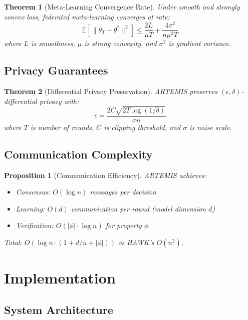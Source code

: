 \documentclass[conference]{IEEEtran}
\newtheorem{theorem}{Theorem}
\newtheorem{proposition}{Proposition}
\begin{document}
\begin{theorem}[Meta-Learning Convergence Rate]
Under smooth and strongly convex loss, federated meta-learning converges at rate:
\begin{equation}
\mathbb{E}[\|\theta_T - \theta^*\|^2] \leq \frac{2L}{\mu T} + \frac{4\sigma^2}{n\mu^2 T}
\end{equation}
where $L$ is smoothness, $\mu$ is strong convexity, and $\sigma^2$ is gradient variance.
\end{theorem}

\subsection{Privacy Guarantees}

\begin{theorem}[Differential Privacy Preservation]
ARTEMIS preserves $(\epsilon, \delta)$-differential privacy with:
\begin{equation}
\epsilon = \frac{2C\sqrt{2T\log(1/\delta)}}{\sigma n}
\end{equation}
where $T$ is number of rounds, $C$ is clipping threshold, and $\sigma$ is noise scale.
\end{theorem}

\subsection{Communication Complexity}

\begin{proposition}[Communication Efficiency]
ARTEMIS achieves:
\begin{itemize}
    \item Consensus: $O(\log n)$ messages per decision
    \item Learning: $O(d)$ communication per round (model dimension $d$)
    \item Verification: $O(|\phi| \cdot \log n)$ for property $\phi$
\end{itemize}
Total: $O(\log n \cdot (1 + d/n + |\phi|))$ vs HAWK's $O(n^2)$.
\end{proposition}

\section{Implementation}

\subsection{System Architecture}
\end{document}
